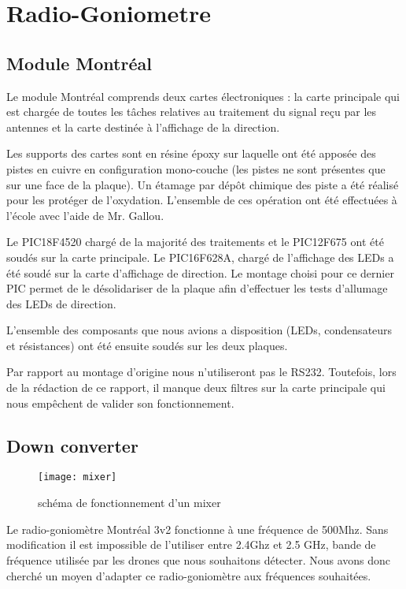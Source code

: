 
\chapter{Radio-Goniometre}

 
\section{Module Montréal}

Le module Montréal comprends deux cartes électroniques : la carte principale qui est chargée de toutes les tâches relatives au traitement du signal reçu par les antennes et la carte destinée à l'affichage de la direction.

Les supports des cartes sont en résine époxy sur laquelle ont été apposée des pistes en cuivre en configuration mono-couche (les pistes ne sont présentes que sur une face de la plaque). Un étamage par dépôt chimique des piste a été réalisé pour les protéger de l'oxydation. L'ensemble de ces opération ont été effectuées à l'école avec l'aide de Mr. Gallou.
 
Le PIC18F4520 chargé de la majorité des traitements et le PIC12F675 ont été soudés sur la carte principale. Le PIC16F628A, chargé de l'affichage des LEDs a été soudé sur la carte d'affichage de direction. Le montage choisi pour ce dernier PIC permet de le désolidariser de la plaque afin d'effectuer les tests d'allumage des LEDs de direction.

L'ensemble des composants que nous avions a disposition (LEDs, condensateurs et résistances) ont été ensuite soudés sur les deux plaques. 

Par rapport au montage d'origine nous n'utiliseront pas le RS232. Toutefois, lors de la rédaction de ce rapport, il manque deux filtres sur la carte principale qui nous empêchent de valider son fonctionnement.


\section{Down converter}


\begin{wrapfigure}{r}{0.4\textwidth}
  
  \texttt{[image: mixer]}
  \caption{schéma de fonctionnement d'un mixer}
\end{wrapfigure}


Le radio-goniomètre Montréal 3v2 fonctionne à une fréquence de 500Mhz. Sans modification il est impossible de l’utiliser entre 2.4Ghz et 2.5 GHz, bande de fréquence utilisée par les drones que nous souhaitons détecter. Nous avons donc cherché un moyen d’adapter ce radio-goniomètre aux fréquences souhaitées.

